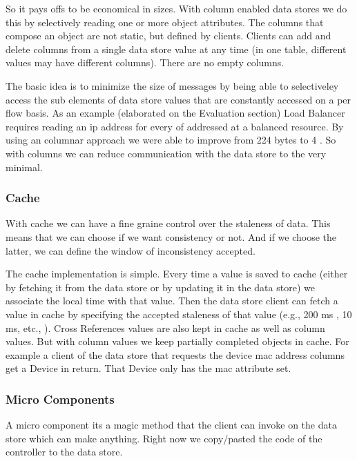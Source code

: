 So it pays offs to be economical in sizes. With column enabled data stores we do this by selectively reading one or more object attributes. 
The columns that compose an object are not static, but defined by clients. Clients can add and delete columns from a single data store value  at any time (in one table, different values may have different columns). There are no empty columns.  

The basic idea is to minimize the size of messages by being able to selectiveley access the sub elements of data store values that are constantly accessed on a per flow basis. 
As an example (elaborated on the Evaluation section) Load Balancer requires reading an \gls{ip} address for every \gls{of} addressed at a balanced resource. By using an columnar approach we were able to improve from 224 bytes to 4 . So with columns we can reduce communication  with the data store to the very minimal. 

\subsubsection{Cache}
With cache we can have a fine graine control over the staleness of data. 
This means that we can choose if we want consistency or not.
And if we choose the latter, we can define the window of inconsistency accepted. 

The cache implementation is simple. 
Every time a value is saved to  cache (either by fetching it from the data store or by updating it in the data store) we associate the local time with that value. 
Then the data store client can fetch a value in cache by specifying the accepted staleness of that value (e.g., 200 ms , 10 ms, etc., ). 
Cross References values are also kept in cache as well as column values. But with column values we  keep partially completed objects in cache. For example a client of the data store that requests the device \gls{mac} address columns get a Device in return.  That Device only has the \gls{mac} attribute set. 

\subsubsection{Micro Components}
A micro component its a magic method that the client can invoke on the data store which can make anything. Right now we copy/pasted the code of the controller to the data store. 

